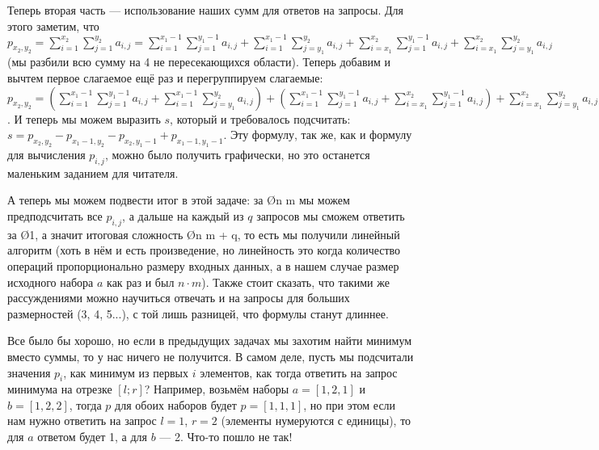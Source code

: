 Теперь вторая часть — использование наших сумм для ответов на запросы. Для этого заметим, что $p_{x_2, y_2} = \sum\limits_{i = 1}^{x_2} \sum\limits_{j = 1}^{y_2} a_{i, j} = \sum\limits_{i = 1}^{x_1 - 1} \sum\limits_{j = 1}^{y_1 - 1} a_{i, j} + \sum\limits_{i = 1}^{x_1 - 1} \sum\limits_{j = y_1}^{y_2} a_{i, j} + \sum\limits_{i = x_1}^{x_2} \sum\limits_{j = 1}^{y_1 - 1} a_{i, j} + \sum\limits_{i = x_1}^{x_2} \sum\limits_{j = y_1}^{y_2} a_{i, j}$ (мы разбили всю сумму на 4 не пересекающихся области). Теперь добавим и вычтем первое слагаемое ещё раз и перегруппируем слагаемые: $p_{x_2, y_2} = \left( \sum\limits_{i = 1}^{x_1 - 1} \sum\limits_{j = 1}^{y_1 - 1} a_{i, j} + \sum\limits_{i = 1}^{x_1 - 1} \sum\limits_{j = y_1}^{y_2} a_{i, j} \right) + \left( \sum\limits_{i = 1}^{x_1 - 1} \sum\limits_{j = 1}^{y_1 - 1} a_{i, j} + \sum\limits_{i = x_1}^{x_2} \sum\limits_{j = 1}^{y_1 - 1} a_{i, j} \right) + \sum\limits_{i = x_1}^{x_2} \sum\limits_{j = y_1}^{y_2} a_{i, j} - \sum\limits_{i = 1}^{x_1 - 1} \sum\limits_{j = 1}^{y_1 - 1} a_{i, j} = \sum\limits_{i = 1}^{x_1 - 1} \sum\limits_{j = 1}^{y_2} a_{i, j} + \sum\limits_{i = 1}^{x_2} \sum\limits_{j = 1}^{y_1 - 1} a_{i, j} + \sum\limits_{i = x_1}^{x_2} \sum\limits_{j = y_1}^{y_2} a_{i, j} - \sum\limits_{i = 1}^{x_1 - 1} \sum\limits_{j = 1}^{y_1 - 1} a_{i, j} = p_{x_1 - 1, y_2} + p_{x_2, y_1 - 1} + s - p_{x_1 - 1, y_1 - 1}$. И теперь мы можем выразить $s$, который и требовалось подсчитать: $s = p_{x_2, y_2} - p_{x_1 - 1, y_2} - p_{x_2, y_1 - 1} + p_{x_1 - 1, y_1 - 1}$. Эту формулу, так же, как и формулу для вычисления $p_{i, j}$, можно было получить графически, но это останется маленьким заданием для читателя.

А теперь мы можем подвести итог в этой задаче: за \O{n \cdot m} мы можем предподсчитать все $p_{i, j}$, а дальше на каждый из $q$ запросов мы сможем ответить за \O{1}, а значит итоговая сложность \O{n \cdot m + q}, то есть мы получили линейный алгоритм (хоть в нём и есть произведение, но линейность это когда количество операций пропорционально размеру входных данных, а в нашем случае размер исходного набора $a$ как раз и был $n \cdot m$). Также стоит сказать, что такими же рассуждениями можно научиться отвечать и на запросы для больших размерностей (3, 4, 5...), с той лишь разницей, что формулы станут длиннее.


Все было бы хорошо, но если в предыдущих задачах мы захотим найти минимум вместо суммы, то у нас ничего не получится. В самом деле, пусть мы подсчитали значения $p_i$, как минимум из первых $i$ элементов, как тогда ответить на запрос минимума на отрезке $[l; r]$? Например, возьмём наборы $a = [1, 2, 1]$ и $b = [1, 2, 2]$, тогда $p$ для обоих наборов будет $p = [1, 1, 1]$, но при этом если нам нужно ответить на запрос $l = 1$, $r = 2$ (элементы нумеруются с единицы), то для $a$ ответом будет 1, а для $b$ — 2. Что-то пошло не так!

